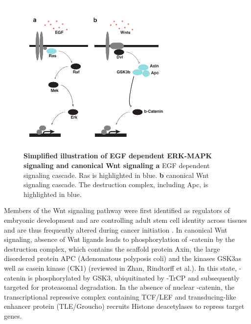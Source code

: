 \begin{flushleft}
\begin{figure}[h]
\centering
\includegraphics[width=0.7\textwidth,
                keepaspectratio]{figures/adenomaprofiling/pdf/fig_0_1.pdf}
\caption[Simplified illustration of ERK-MAPK signaling and canonical Wnt signaling]{\textbf{Simplified illustration of EGF dependent ERK-MAPK signaling and canonical Wnt signaling a} EGF dependent signaling cascade. Ras is highlighted in blue. \textbf{b} canonical Wnt signaling cascade. The destruction complex, including Apc, is highlighted in blue.}
\label{fig_180}
\end{figure}
\bigbreak


Members of the Wnt signaling pathway were first identified as regulators of embryonic development \cite{Sharma1973WinglessMelanogaster} and are controlling adult stem cell identity across tissues and are thus frequently altered during cancer initiation \cite{Nusslein-Volhard1980MutationsDrosophila}. In canonical Wnt signaling, absence of Wnt ligands leads to phosphorylation of \textbeta-catenin by the destruction complex, which contains the scaffold protein Axin, the large disordered protein APC (Adenomatous polyposis coli) and the kinases GSK3\textbeta as well as casein kinase (CK1\textalpha) (reviewed in Zhan, Rindtorff et al.\cite{Zhan2017}). 
In this state, \textbeta-catenin is phosphorylated by GSK3\textbeta, ubiquitinated by \textbeta-TrCP and subsequently targeted for proteasomal degradation. 
In the absence of nuclear \textbeta-catenin, the transcriptional repressive complex containing TCF/LEF and transducing-like enhancer protein (TLE/Groucho) recruits Histone deacetylases to repress target genes. \par 


\end{flushleft}
